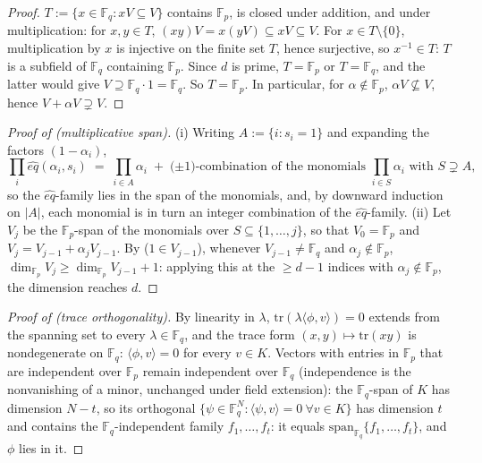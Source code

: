 \documentclass{article}
\newcommand{\Fp}{\mathbb{F}_p}
\newcommand{\Fq}{\mathbb{F}_q}
\newcommand{\extdeg}{d}
\theoremstyle{definition}
\begin{document}
\begin{proof}
$T := \{x \in \Fq : xV \subseteq V\}$ contains $\Fp$, is closed under addition, and under multiplication: for $x, y \in T$, $(xy)V = x(yV) \subseteq xV \subseteq V$. For $x \in T \setminus \{0\}$, multiplication by $x$ is injective on the finite set $T$, hence surjective, so $x^{-1} \in T$: $T$ is a subfield of $\Fq$ containing $\Fp$. Since $\extdeg$ is prime, $T = \Fp$ or $T = \Fq$, and the latter would give $V \supseteq \Fq \cdot 1 = \Fq$. So $T = \Fp$. In particular, for $\alpha \notin \Fp$, $\alpha V \not\subseteq V$, hence $V + \alpha V \supsetneq V$.
\end{proof}

\begin{proof}[Proof of  (multiplicative span)]
(i) Writing $A := \{i : s_i = 1\}$ and expanding the factors $(1 - \alpha_i)$,
\[
\prod_{i} \hat{eq}(\alpha_i, s_i) \;=\; \prod_{i \in A} \alpha_i \;+\; \text{($\pm 1$)-combination of the monomials } \prod_{i \in S} \alpha_i \text{ with } S \supsetneq A ,
\]
so the $\hat{eq}$-family lies in the span of the monomials, and, by downward induction on $|A|$, each monomial is in turn an integer combination of the $\hat{eq}$-family. (ii) Let $V_j$ be the $\Fp$-span of the monomials over $S \subseteq \{1, \dots, j\}$, so that $V_0 = \Fp$ and $V_j = V_{j-1} + \alpha_j V_{j-1}$. By  ($1 \in V_{j-1}$), whenever $V_{j-1} \neq \Fq$ and $\alpha_j \notin \Fp$, $\dim_{\Fp} V_j \geq \dim_{\Fp} V_{j-1} + 1$: applying this at the $\geq \extdeg - 1$ indices with $\alpha_j \notin \Fp$, the dimension reaches $\extdeg$.
\end{proof}

\begin{proof}[Proof of  (trace orthogonality)]
By linearity in $\lambda$, $\mathrm{tr}(\lambda \langle \phi, v \rangle) = 0$ extends from the spanning set to every $\lambda \in \Fq$, and the trace form $(x, y) \mapsto \mathrm{tr}(xy)$ is nondegenerate on $\Fq$: $\langle \phi, v \rangle = 0$ for every $v \in K$. Vectors with entries in $\Fp$ that are independent over $\Fp$ remain independent over $\Fq$ (independence is the nonvanishing of a minor, unchanged under field extension): the $\Fq$-span of $K$ has dimension $N - t$, so its orthogonal $\{\psi \in \Fq^N : \langle \psi, v \rangle = 0 \ \forall v \in K\}$ has dimension $t$ and contains the $\Fq$-independent family $f_1, \dots, f_t$: it equals $\mathrm{span}_{\Fq}\{f_1, \dots, f_t\}$, and $\phi$ lies in it.
\end{proof}
\end{document}
